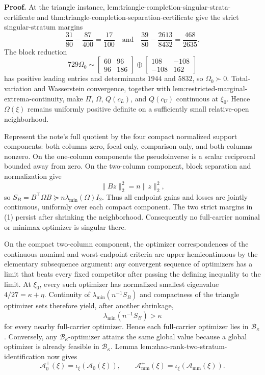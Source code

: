 \textbf{Proof.}
At the triangle instance, lem:triangle-completion-singular-strata-certificate and thm:triangle-completion-separation-certificate give the strict singular-stratum margins
\[
\frac{31}{80}-\frac{87}{400}=\frac{17}{100}
\quad\text{and}\quad
\frac{39}{80}-\frac{2613}{8432}=\frac{468}{2635}.
\tag{1}
\]
The block reduction
\[
729\Omega_0\sim
\begin{bmatrix}60&96\\96&186\end{bmatrix}
\oplus
\begin{bmatrix}108&-108\\-108&162\end{bmatrix}
\]
has positive leading entries and determinants \(1944\) and \(5832\), so \(\Omega_0\succ0\).  Total-variation and Wasserstein convergence, together with lem:restricted-marginal-extrema-continuity, make \(\Pi\), \(\Omega\), \(Q(c_L)\), and \(Q(c_U)\) continuous at \(\xi_0\).  Hence \(\Omega(\xi)\) remains uniformly positive definite on a sufficiently small relative-open neighborhood.

Represent the note's full quotient by the four compact normalized support components: both columns zero, focal only, comparison only, and both columns nonzero.  On the one-column components the pseudoinverse is a scalar reciprocal bounded away from zero.  On the two-column component, block separation and normalization give
\[
\lVert Bz\rVert_2^2=n\lVert z\rVert_2^2,
\]
so \(S_B=B^{\top}\Omega B\succeq n\lambda_{\min}(\Omega)I_2\).  Thus all endpoint gains and losses are jointly continuous, uniformly over each compact component.  The two strict margins in (1) persist after shrinking the neighborhood.  Consequently no full-carrier nominal or minimax optimizer is singular there.

On the compact two-column component, the optimizer correspondences of the continuous nominal and worst-endpoint criteria are upper hemicontinuous by the elementary subsequence argument: any convergent sequence of optimizers has a limit that beats every fixed competitor after passing the defining inequality to the limit.  At \(\xi_0\), every such optimizer has normalized smallest eigenvalue \(4/27=\kappa+\eta\).  Continuity of \(\lambda_{\min}(n^{-1}S_B)\) and compactness of the triangle optimizer sets therefore yield, after another shrinkage,
\[
\lambda_{\min}(n^{-1}S_B)>\kappa
\tag{2}
\]
for every nearby full-carrier optimizer.  Hence each full-carrier optimizer lies in \(\mathcal B_\kappa\).  Conversely, any \(\mathcal B_\kappa\)-optimizer attains the same global value because a global optimizer is already feasible in \(\mathcal B_\kappa\).  Lemma lem:zhao-rank-two-stratum-identification now gives
\[
\mathcal A_0^+(\xi)=\iota_\xi(\mathcal A_0(\xi)),
\qquad
\mathcal A_{\mathrm{mm}}^+(\xi)=\iota_\xi(\mathcal A_{\mathrm{mm}}(\xi)).
\tag{3}
\]


